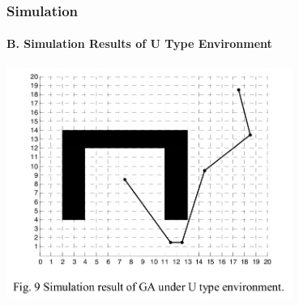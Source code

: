 \frame
{
\frametitle{Simulation}
\framesubtitle{B. Simulation Results of U Type Environment}
\begin{center}
	\includegraphics[width=0.7\textwidth]{img/garesult2}
\end{center}
}

